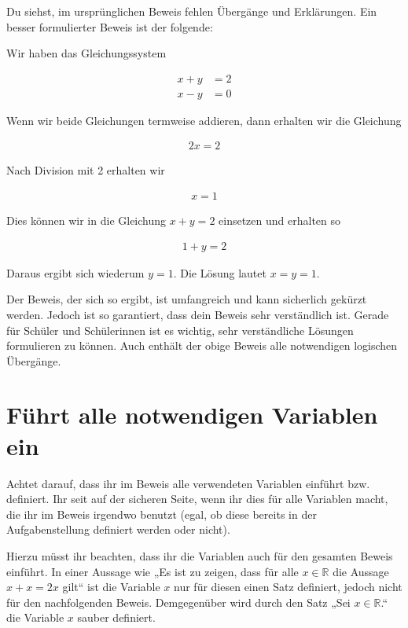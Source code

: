 \documentclass[a4paper]{article}
\newcommand*{\R}{\mathbb R}
\begin{document}
Du siehst, im ursprünglichen Beweis fehlen Übergänge und Erklärungen. Ein besser formulierter Beweis ist der folgende:

\begin{addmargin}{2cm}
  Wir haben das Gleichungssystem

  \begin{align}
    x+y&=2 \\
    x-y&=0
  \end{align}

  Wenn wir beide Gleichungen termweise addieren, dann erhalten wir die Gleichung

  \begin{align}
    2x=2
  \end{align}

  Nach Division mit 2 erhalten wir

  \begin{align}
    x=1
  \end{align}

  Dies können wir in die Gleichung $x+y=2$ einsetzen und erhalten so

  \begin{align}
    1+y=2
  \end{align}

  Daraus ergibt sich wiederum $y=1$. Die Lösung lautet $x=y=1$.
\end{addmargin}

Der Beweis, der sich so ergibt, ist umfangreich und kann sicherlich gekürzt werden. Jedoch ist so garantiert, dass dein Beweis sehr verständlich ist. Gerade für Schüler und Schülerinnen ist es wichtig, sehr verständliche Lösungen formulieren zu können. Auch enthält der obige Beweis alle notwendigen logischen Übergänge.

\section{Führt alle notwendigen Variablen ein}

Achtet darauf, dass ihr im Beweis alle verwendeten Variablen einführt bzw. definiert. Ihr seit auf der sicheren Seite, wenn ihr dies für alle Variablen macht, die ihr im Beweis irgendwo benutzt (egal, ob diese bereits in der Aufgabenstellung definiert werden oder nicht).

Hierzu müsst ihr beachten, dass ihr die Variablen auch für den gesamten Beweis einführt. In einer Aussage wie „Es ist zu zeigen, dass für alle $x\in\R$ die Aussage $x+x=2x$ gilt“ ist die Variable $x$ nur für diesen einen Satz definiert, jedoch nicht für den nachfolgenden Beweis. Demgegenüber wird durch den Satz „Sei $x\in\R$.“ die Variable $x$ sauber definiert.
\end{document}
